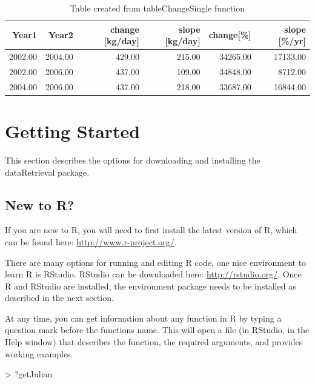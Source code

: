 \documentclass[a4paper,11pt]{article}
\begin{document}
\begin{table}[!ht]
\begin{center}
\caption{Table created from tableChangeSingle function}
\label{table:tableChangeSingle}
\begin{tabular}{rrrrrr}
  \hline
Year1 & Year2 & change [kg/day] & slope [kg/day] & change[\%] & slope [\%/yr] \\ 
  \hline
2002.00 & 2004.00 & 429.00 & 215.00 & 34265.00 & 17133.00 \\ 
  2002.00 & 2006.00 & 437.00 & 109.00 & 34848.00 & 8712.00 \\ 
  2004.00 & 2006.00 & 437.00 & 218.00 & 33687.00 & 16844.00 \\ 
   \hline
\end{tabular}
\end{center}
\end{table}

\clearpage

\appendix
\section{Getting Started}
\label{sec:appendix1}
This section describes the options for downloading and installing the dataRetrieval package.

\subsection{New to R?}
If you are new to R, you will need to first install the latest version of R, which can be found here: \url{http://www.r-project.org/}.

There are many options for running and editing R code, one nice environment to learn R is RStudio. RStudio can be downloaded here: \url{http://rstudio.org/}. Once R and RStudio are installed, the environment package needs to be installed as described in the next section.

At any time, you can get information about any function in R by typing a question mark before the functions name.  This will open a file (in RStudio, in the Help window) that describes the function, the required arguments, and provides working examples.

\begin{Schunk}
\begin{Sinput}
> ?getJulian
\end{Sinput}
\end{Schunk}
\end{document}
